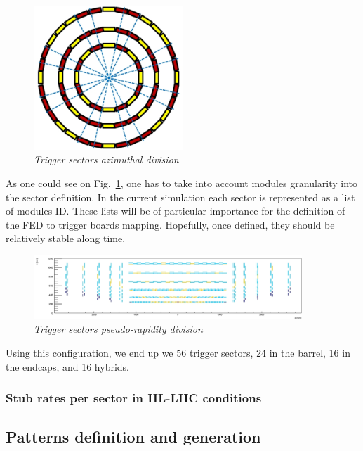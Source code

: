 \begin{figure}[ht!]
\centering
\includegraphics[width=0.5\textwidth]{Plots/AzimuthCut.eps}
\caption{\emph{Trigger sectors azimuthal division}}
\label{fig:SEC_PHI}
\end{figure} 

\noindent As one could see on Fig.~\ref{fig:SEC_PHI}, one has to take into account modules granularity into the sector definition. In the current simulation each sector is represented as a list of modules ID. These lists will be of particular importance for the definition of the FED to trigger boards mapping. Hopefully, once defined, they should be relatively stable along time. 

\begin{figure}[ht!]
\centering
\includegraphics[width=0.9\textwidth]{Plots/EtaCut.eps}
\caption{\emph{Trigger sectors pseudo-rapidity division}}
\label{fig:SEC_ETA}
\end{figure} 

\noindent Using this configuration, we end up we 56 trigger sectors, 24 in the barrel, 16 in the endcaps, and 16 hybrids.

\subsubsection{Stub rates per sector in HL-LHC conditions}





\subsection{Patterns definition and generation}

